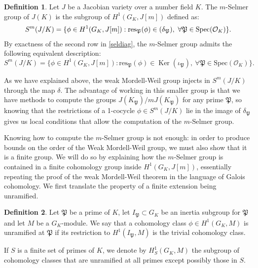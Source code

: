 \documentclass[a4paper, 12pt]{amsart}
\theoremstyle{definition}
\newtheorem{defn0}{Definition}[section]
\theoremstyle{plain}
\theoremstyle{plain}
\theoremstyle{plain}
\theoremstyle{plain}
\theoremstyle{remark}
\theoremstyle{remark}
\theoremstyle{plain}
\newenvironment{definition}{ \begin{defn0}}{\end{defn0}}
\renewcommand{\P}{\mathfrak{P}}
\DeclareMathOperator{\Ker}{Ker}
\let\Im\relax
\DeclareMathOperator{\Im}{Im}
\begin{document}
	\begin{definition}
		Let $J$ be a Jacobian variety over a number field $K$. The $m$-Selmer group of $J(K)$ is the subgroup of $H^1(G_K,J[m])$ defined as:
		\begin{equation*}
			S^m(J/K)=\{\phi\in H^1(G_K,J[m]):\text{res}_\P(\phi)\in \Im(\delta_\P), \ \forall \P\in\text{Spec}(\mathcal{O}_K)\}.
		\end{equation*}
		By exactness of the second row in \eqref{seldiag}, the $m$-Selmer group admits the following equivalent description:
		\begin{equation*}
			S^m(J/K)=\{\phi\in H^1(G_K,J[m]):\text{res}_\P(\phi)\in \Ker(\iota_\P), \ \forall \P\in\text{Spec}(\mathcal{O}_K)\}.
		\end{equation*}
	\end{definition}
	As we have explained above, the weak Mordell-Weil group injects in $S^m(J/K)$ through the map $\delta$. The advantage of working in this smaller group is that we have methods to compute the groups $J(K_\P)/mJ(K_\P)$ for any prime $\P$, so knowing that the restrictions of a 1-cocycle $\phi\in S^m(J/K)$ lie in the image of $\delta_\P$ gives us local conditions that allow the computation of the $m$-Selmer group.
	
	Knowing how to compute the $m$-Selmer group is not enough: in order to produce bounds on the order of the Weak Mordell-Weil group, we must also show that it is a finite group. We will do so by explaining how the $m$-Selmer group is contained in a finite cohomology group inside $H^1(G_K,J[m])$, essentially repeating the proof of the weak Mordell-Weil theorem in the language of Galois cohomology. We first translate the property of a finite extension being unramified.
	\begin{definition}
		Let $\P$ be a prime of $K$, let $I_\P\subset G_K$ be an inertia subgroup for $\P$ and let $M$ be a $G_K$-module. We say that a cohomology class $\phi\in H^1(G_K,M)$ is unramified at $\P$ if its restriction to $H^1(I_\P, M)$ is the trivial cohomology class.
		
		If $S$ is a finite set of primes of $K$, we denote by $H^1_S(G_K,M)$ the subgroup of cohomology classes that are unramified at all primes except possibly those in $S$.
	\end{definition} 
	
\end{document}
